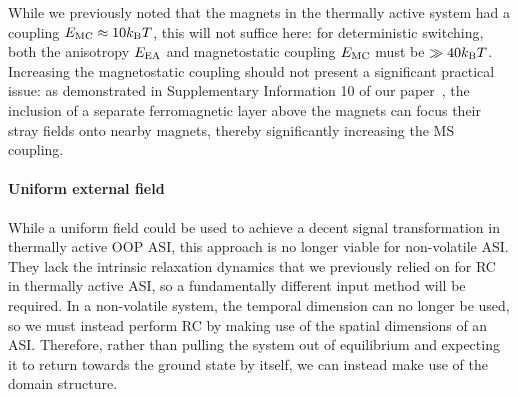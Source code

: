 While we previously noted that the magnets in the thermally active system had a coupling $\EMC \approx 10 \kBT$, this will not suffice here: for deterministic switching, both the anisotropy $E_\mathrm{EA}$ and magnetostatic coupling $E_\mathrm{MC}$ must be $\gg 40 \kBT$.
Increasing the magnetostatic coupling should not present a significant practical issue: as demonstrated in Supplementary Information 10 of our paper~\cite{KUR-24}, the inclusion of a separate ferromagnetic layer above the magnets can focus their stray fields onto nearby magnets, thereby significantly increasing the MS coupling.

\paragraph{Uniform external field}
While a uniform field could be used to achieve a decent signal transformation in thermally active OOP ASI, this approach is no longer viable for non-volatile ASI.
They lack the intrinsic relaxation dynamics that we previously relied on for RC in thermally active ASI, so a fundamentally different input method will be required.
In a non-volatile system, the temporal dimension can no longer be used, so we must instead perform RC by making use of the spatial dimensions of an ASI.
Therefore, rather than pulling the system out of equilibrium and expecting it to return towards the ground state by itself, we can instead make use of the domain structure.


